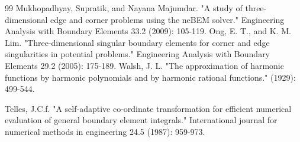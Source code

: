 \documentclass[12pt,oneside,reqno]{amsart}%
\theoremstyle{plain}
\numberwithin{equation}{section}
\begin{document}
\begin{thebibliography}{99}
Mukhopadhyay, Supratik, and Nayana Majumdar. "A study of three-dimensional edge and corner problems using the neBEM solver." Engineering Analysis with Boundary Elements 33.2 (2009): 105-119.
Ong, E. T., and K. M. Lim. "Three-dimensional singular boundary elements for corner and edge singularities in potential problems." Engineering Analysis with Boundary Elements 29.2 (2005): 175-189.
Walsh, J. L. "The approximation of harmonic functions by harmonic polynomials and by harmonic rational functions." (1929): 499-544.

Telles, J.C.f. "A self‐adaptive co‐ordinate transformation for efficient numerical evaluation of general boundary element integrals." International journal for numerical methods in engineering 24.5 (1987): 959-973.

\end{thebibliography}
\end{document}
